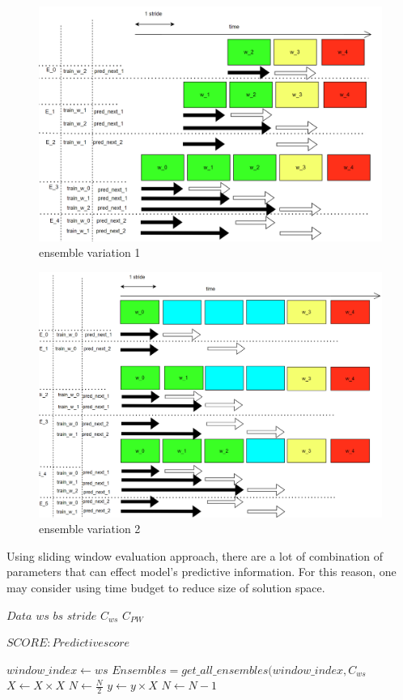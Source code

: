 \documentclass{IEEEtran}
\begin{document}
\begin{figure}[htbp]
\centering
\includegraphics[width=.9\linewidth]{./images/screenshot_20220321_124235.png}
\caption{\label{ensemble_variation_1}ensemble variation 1}
\end{figure}

\begin{figure}[htbp]
\centering
\includegraphics[width=.9\linewidth]{./images/screenshot_20220321_124707.png}
\caption{\label{ensemble_variation_2}ensemble variation 2}
\end{figure}

Using sliding window evaluation approach, there are a lot of combination of parameters that can effect model's predictive information. For this reason, one may consider using time budget to reduce size of solution space.

\begin{algorithmic}
\Input
 \State $Data$
 \State $ws$
 \State $bs$
 \State $stride$
 \State $C_{ws}$
 \State $C_{PW}$
\Input

\Output
 \State $SCORE: Predictive score$
\Output

\Begin
    \State $window\_index \gets ws$
    \State $Ensembles = get\_all\_ensembles(window\_index, C_{ws}$
    \EndFor
        \State $X \gets X \times X$
        \State $N \gets \frac{N}{2}$  
        \State $y \gets y \times X$
        \State $N \gets N - 1$
    \EndIf
    \EndWhile
\End
\end{algorithmic}
\end{document}

